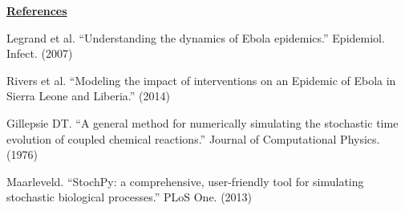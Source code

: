 \documentclass[11pt,letter]{article}
\begin{document}
\underline{\textbf{References}}\vspace{0.5mm}
\begin{enumerate}[ {[}1{]} ]
\item{Legrand et al. ``Understanding the dynamics of Ebola epidemics.'' Epidemiol. Infect. (2007)}
\item{Rivers et al. ``Modeling the impact of interventions on an Epidemic of Ebola in Sierra Leone and Liberia.'' (2014)}
\item{Gillepsie DT. ``A general method for numerically simulating the stochastic time evolution of coupled chemical reactions.'' Journal of Computational Physics. (1976)}
\item{Maarleveld. ``StochPy: a comprehensive, user-friendly tool for simulating stochastic biological processes.'' PLoS One. (2013)}
\end{enumerate}
\end{document}
